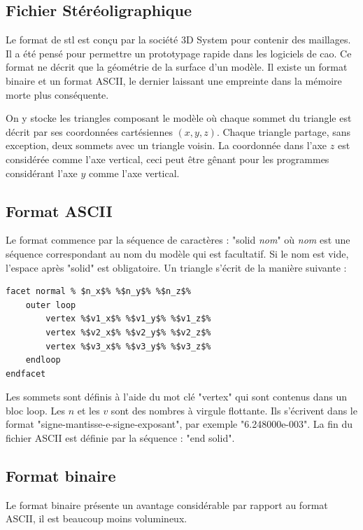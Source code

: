 \subsection{Fichier Stéréoligraphique}

Le format de \gls{stl} est conçu par la société 3D System pour contenir des maillages.
Il a été pensé pour permettre un prototypage rapide dans les logiciels de \gls{cao}. 
Ce format ne décrit que la géométrie de la surface d'un modèle.
Il existe un format binaire et un format ASCII, le dernier laissant une empreinte dans la mémoire morte plus conséquente.

On y stocke les triangles composant le modèle où chaque sommet du triangle est décrit par ses coordonnées cartésiennes $(x,y,z)$. Chaque triangle partage, sans exception, deux sommets avec un triangle voisin.
La coordonnée dans l'axe $z$ est considérée comme l'axe vertical, ceci peut être gênant pour les programmes considérant l'axe $y$ comme l'axe vertical.

\subsection{Format ASCII}

Le format commence par la séquence de caractères : "solid \textit{nom}" où \textit{nom} est une séquence correspondant au nom du modèle qui est facultatif.
Si le nom est vide, l'espace après "solid" est obligatoire.
Un triangle s'écrit de la manière suivante :
\begin{minipage}{\linewidth}
\begin{lstlisting}[frame=single, escapechar=\%]
facet normal % $n_x$% %$n_y$% %$n_z$%
    outer loop
        vertex %$v1_x$% %$v1_y$% %$v1_z$%
        vertex %$v2_x$% %$v2_y$% %$v2_z$%
        vertex %$v3_x$% %$v3_y$% %$v3_z$%
    endloop
endfacet
\end{lstlisting}
\end{minipage}
Les sommets sont définis à l'aide du mot clé "vertex" qui sont contenus dans un bloc loop. Les $n$ et les $v$ sont des nombres à virgule flottante.
Ils s'écrivent dans le format "signe-mantisse-e-signe-exposant", par exemple "6.248000e-003".
La fin du fichier ASCII est définie par la séquence : "end solid".

\subsection{Format binaire}

Le format binaire présente un avantage considérable par rapport au format ASCII, il est beaucoup moins volumineux. 


